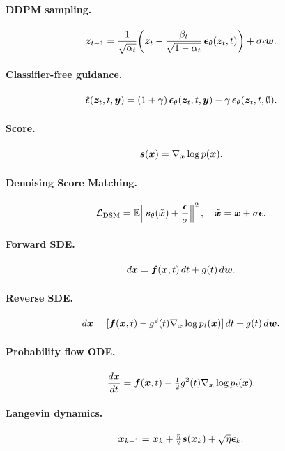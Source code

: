 \paragraph{DDPM sampling.}
\[
\bm{z}_{t-1} = \frac{1}{\sqrt{\alpha_t}}\!\left(\bm{z}_t - \frac{\beta_t}{\sqrt{1-\bar\alpha_t}}\,\boldsymbol{\epsilon}_\theta(\bm{z}_t, t)\right) + \sigma_t \bm{w}.
\]

\paragraph{Classifier-free guidance.}
\[
\hat{\boldsymbol{\epsilon}}(\bm{z}_t, t, \bm{y}) = (1+\gamma)\,\boldsymbol{\epsilon}_\theta(\bm{z}_t, t, \bm{y}) - \gamma\,\boldsymbol{\epsilon}_\theta(\bm{z}_t, t, \emptyset).
\]

\paragraph{Score.}
\[
\bm{s}(\bm{x}) = \nabla_{\bm{x}}\log p(\bm{x}).
\]

\paragraph{Denoising Score Matching.}
\[
\mathcal{L}_{\text{DSM}} = \mathbb{E}\!\left\| \bm{s}_\theta(\tilde{\bm{x}}) + \frac{\boldsymbol{\epsilon}}{\sigma}\right\|^2, \quad \tilde{\bm{x}} = \bm{x} + \sigma\boldsymbol{\epsilon}.
\]

\paragraph{Forward SDE.}
\[
d\bm{x} = \bm{f}(\bm{x}, t)\, dt + g(t)\, d\bm{w}.
\]

\paragraph{Reverse SDE.}
\[
d\bm{x} = [\bm{f}(\bm{x}, t) - g^2(t) \nabla_{\bm{x}}\log p_t(\bm{x})]\, dt + g(t)\, d\bar{\bm{w}}.
\]

\paragraph{Probability flow ODE.}
\[
\frac{d\bm{x}}{dt} = \bm{f}(\bm{x},t) - \tfrac{1}{2}g^2(t)\nabla_{\bm{x}}\log p_t(\bm{x}).
\]

\paragraph{Langevin dynamics.}
\[
\bm{x}_{k+1} = \bm{x}_k + \tfrac{\eta}{2}\bm{s}(\bm{x}_k) + \sqrt{\eta}\boldsymbol{\epsilon}_k.
\]

